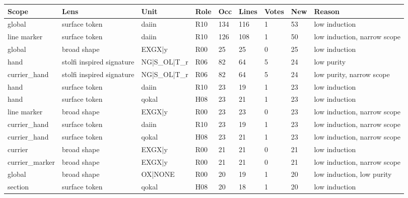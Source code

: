 \begin{tabular}{lllllllll}
\toprule
Scope & Lens & Unit & Role & Occ & Lines & Votes & New & Reason \\
\midrule
global & surface token & daiin & R10 & 134 & 116 & 1 & 53 & low induction \\
line marker & surface token & daiin & R10 & 126 & 108 & 1 & 50 & low induction, narrow scope \\
global & broad shape & EXGX|y & R00 & 25 & 25 & 0 & 25 & low induction \\
hand & stolfi inspired signature & NG|S\_OL|T\_r & R06 & 82 & 64 & 5 & 24 & low purity \\
currier\_hand & stolfi inspired signature & NG|S\_OL|T\_r & R06 & 82 & 64 & 5 & 24 & low purity, narrow scope \\
hand & surface token & daiin & R10 & 23 & 19 & 1 & 23 & low induction \\
hand & surface token & qokal & H08 & 23 & 21 & 1 & 23 & low induction \\
line marker & broad shape & EXGX|y & R00 & 23 & 23 & 0 & 23 & low induction, narrow scope \\
currier\_hand & surface token & daiin & R10 & 23 & 19 & 1 & 23 & low induction, narrow scope \\
currier\_hand & surface token & qokal & H08 & 23 & 21 & 1 & 23 & low induction, narrow scope \\
currier & broad shape & EXGX|y & R00 & 21 & 21 & 0 & 21 & low induction \\
currier\_marker & broad shape & EXGX|y & R00 & 21 & 21 & 0 & 21 & low induction, narrow scope \\
global & broad shape & OX|NONE & R00 & 20 & 19 & 1 & 20 & low induction, low purity \\
section & surface token & qokal & H08 & 20 & 18 & 1 & 20 & low induction \\
\bottomrule
\end{tabular}